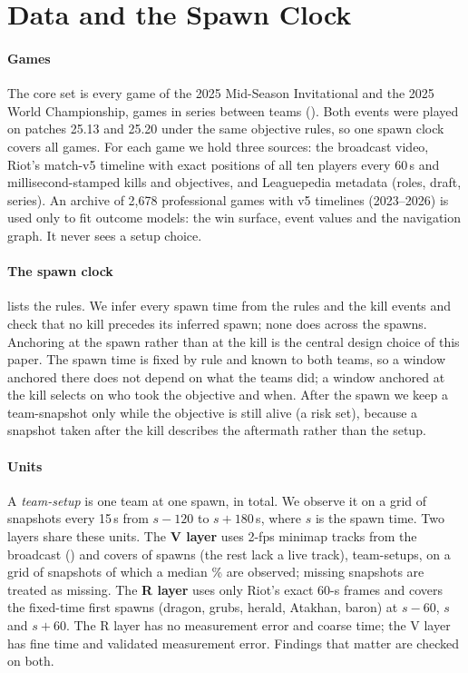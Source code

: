 \section{Data and the Spawn Clock}
\label{sec:data}


\paragraph*{Games}
The core set is every game of the 2025 Mid-Season Invitational and the 2025 World Championship,  games in  series between  teams ().
Both events were played on patches 25.13 and 25.20 under the same objective rules, so one spawn clock covers all games.
For each game we hold three sources: the broadcast video, Riot's match-v5 timeline \citep{riotapi} with exact positions of all ten players every 60\,s and millisecond-stamped kills and objectives, and Leaguepedia \citep{leaguepedia} metadata (roles, draft, series).
An archive of 2,678 professional games with v5 timelines (2023--2026) is used only to fit outcome models: the win surface, event values and the navigation graph.
It never sees a setup choice.

\paragraph*{The spawn clock}
 lists the rules.
We infer every spawn time from the rules and the kill events and check that no kill precedes its inferred spawn; none does across the  spawns.
Anchoring at the spawn rather than at the kill is the central design choice of this paper.
The spawn time is fixed by rule and known to both teams, so a window anchored there does not depend on what the teams did; a window anchored at the kill selects on who took the objective and when.
After the spawn we keep a team-snapshot only while the objective is still alive (a risk set), because a snapshot taken after the kill describes the aftermath rather than the setup.


\paragraph*{Units}
A \emph{team-setup} is one team at one spawn,  in total.
We observe it on a grid of snapshots every 15\,s from $s{-}120$ to $s{+}180$\,s, where $s$ is the spawn time.
Two layers share these units.
The \textbf{V layer} uses 2-fps minimap tracks from the broadcast () and covers  of  spawns (the rest lack a live track),  team-setups, on a grid of  snapshots of which a median \% are observed; missing snapshots are treated as missing.
The \textbf{R layer} uses only Riot's exact 60-s frames and covers the fixed-time first spawns (dragon, grubs, herald, Atakhan, baron) at $s{-}60$, $s$ and $s{+}60$.
The R layer has no measurement error and coarse time; the V layer has fine time and validated measurement error.
Findings that matter are checked on both.

